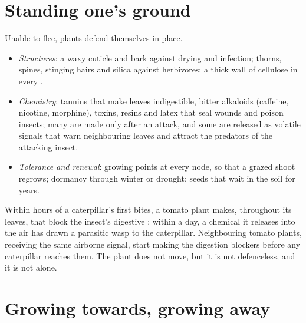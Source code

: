 \section{Standing one's ground}

\begin{proposition}\label{prop:g12:plant-rooted-life:defences}
Unable to flee, plants defend themselves in place.
\begin{itemize}
  \item \emph{Structures}: a waxy cuticle and bark against drying and
        infection; thorns, spines, stinging hairs and silica against
        herbivores; a thick wall of cellulose in every .
  \item \emph{Chemistry}: tannins that make leaves indigestible,
        bitter alkaloids (caffeine, nicotine, morphine), toxins,
        resins and latex that seal wounds and poison insects; many
        are made only after an attack, and some are released as
        volatile signals that warn neighbouring leaves and attract the
        predators of the attacking insect.
  \item \emph{Tolerance and renewal}: growing points at every node,
        so that a grazed shoot regrows; dormancy through winter or
        drought; seeds that wait in the soil for years.
\end{itemize}
\end{proposition}
\admitted

\begin{example}\label{ex:g12:plant-rooted-life:caterpillar}
Within hours of a caterpillar's first bites, a tomato plant makes,
throughout its leaves,  that block the insect's digestive
; within a day, a chemical it releases into the air has drawn a
parasitic wasp to the caterpillar. Neighbouring tomato plants,
receiving the same airborne signal, start making the digestion
blockers before any caterpillar reaches them. The plant does not move,
but it is not defenceless, and it is not alone.
\end{example}

\section{Growing towards, growing away}

